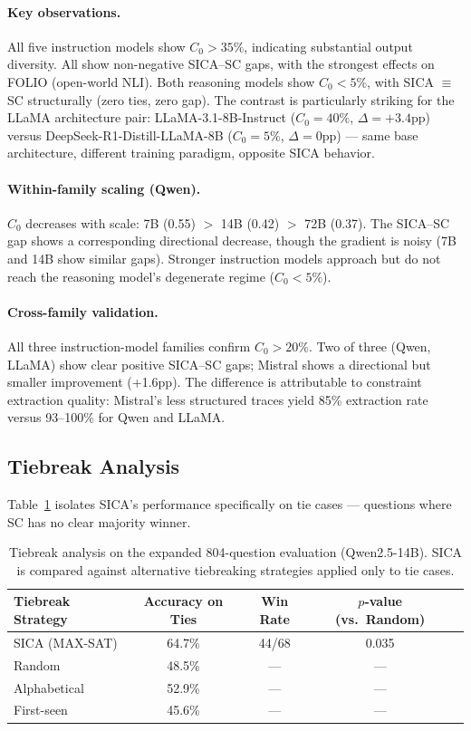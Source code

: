 \documentclass[11pt]{article}
\begin{document}
\paragraph{Key observations.} All five instruction models show $C_0 > 35\%$, indicating substantial output diversity. All show non-negative SICA--SC gaps, with the strongest effects on FOLIO (open-world NLI). Both reasoning models show $C_0 < 5\%$, with SICA $\equiv$ SC structurally (zero ties, zero gap). The contrast is particularly striking for the LLaMA architecture pair: LLaMA-3.1-8B-Instruct ($C_0 = 40\%$, $\Delta = +3.4$pp) versus DeepSeek-R1-Distill-LLaMA-8B ($C_0 = 5\%$, $\Delta = 0$pp) --- same base architecture, different training paradigm, opposite SICA behavior.

\paragraph{Within-family scaling (Qwen).} $C_0$ decreases with scale: 7B (0.55) $>$ 14B (0.42) $>$ 72B (0.37). The SICA--SC gap shows a corresponding directional decrease, though the gradient is noisy (7B and 14B show similar gaps). Stronger instruction models approach but do not reach the reasoning model's degenerate regime ($C_0 < 5\%$).

\paragraph{Cross-family validation.} All three instruction-model families confirm $C_0 > 20\%$. Two of three (Qwen, LLaMA) show clear positive SICA--SC gaps; Mistral shows a directional but smaller improvement (+1.6pp). The difference is attributable to constraint extraction quality: Mistral's less structured traces yield 85\% extraction rate versus 93--100\% for Qwen and LLaMA.

\subsection{Tiebreak Analysis}

Table~\ref{tab:tiebreak} isolates SICA's performance specifically on tie cases --- questions where SC has no clear majority winner.

\begin{table}[t]
\centering
\caption{Tiebreak analysis on the expanded 804-question evaluation (Qwen2.5-14B). SICA is compared against alternative tiebreaking strategies applied only to tie cases.}
\label{tab:tiebreak}
\small
\begin{tabular}{@{}lcccc@{}}
\toprule
Tiebreak Strategy & Accuracy on Ties & Win Rate & $p$-value (vs.\ Random) \\
\midrule
SICA (MAX-SAT) & 64.7\% & 44/68 & 0.035 \\
Random & 48.5\% & --- & --- \\
Alphabetical & 52.9\% & --- & --- \\
First-seen & 45.6\% & --- & --- \\
\bottomrule
\end{tabular}
\end{table}
\end{document}

